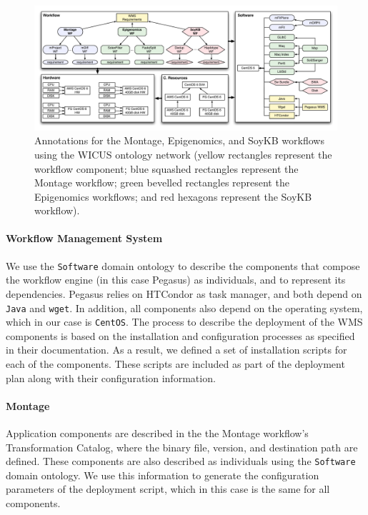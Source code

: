 \begin{figure}[!htb]
	\centering
	\includegraphics[width=\linewidth]{figures/annotations}
	\vspace{-20pt}
	\caption{Annotations for the Montage, Epigenomics, and SoyKB workflows using 
	  the WICUS ontology network (yellow rectangles represent the workflow component; 
	  blue squashed rectangles represent the Montage workflow; green bevelled rectangles 
	  represent the Epigenomics workflows; and red hexagons represent the SoyKB workflow).}
	\label{fig:annotations}
\end{figure}


\paragraph{\textbf{Workflow Management System}}
We use the \texttt{Software} domain ontology to describe the components that
compose the workflow engine (in this case Pegasus) as individuals, and to 
represent its dependencies. Pegasus relies on HTCondor as task manager, and 
both depend on \texttt{Java} and \texttt{wget}. In addition, all components also
depend on the operating system, which in our case is \texttt{CentOS}. The process
to describe the deployment of the WMS components is based on the installation 
and configuration processes as specified in their documentation. As a result, we 
defined a set of installation scripts for each of the components. These scripts are 
included as part of the deployment plan along with their configuration information.


\paragraph{\textbf{Montage}}
Application components are described in the the Montage workflow's Transformation Catalog, where the binary file, version, and destination path are defined. These components are also described as individuals using the \texttt{Software} domain ontology. We use this information to generate the configuration parameters of the deployment script, which in this case is the same for all components. 

